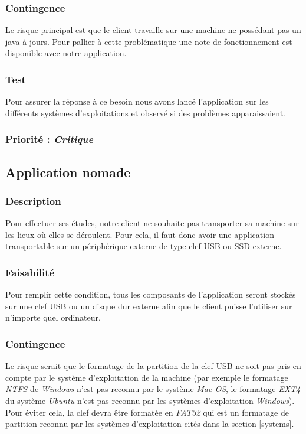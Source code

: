 \subsubsection{Contingence}

Le risque principal est que le client travaille sur une machine ne possédant pas un java à jours. Pour pallier à cette problématique une note de fonctionnement est disponible avec notre application.

\subsubsection{Test}

Pour assurer la réponse à ce besoin nous avons lancé l’application sur les différents systèmes d’exploitations et observé si des problèmes apparaissaient.

\subsubsection{Priorité : \textit{Critique}}

\subsection{Application nomade}\label{nomadite}

\subsubsection{Description}

Pour effectuer ses études, notre client ne souhaite pas transporter sa machine sur les lieux où elles se déroulent. Pour cela, il faut donc avoir une application transportable sur un périphérique externe de type clef USB ou SSD externe.

\subsubsection{Faisabilité}

Pour remplir cette condition, tous les composants de l’application seront stockés sur une clef USB ou un disque dur externe afin que le client puisse l'utiliser sur n’importe quel ordinateur.

\subsubsection{Contingence}

Le risque serait que le formatage de la partition de la clef USB ne soit pas pris en compte par le système d’exploitation de la machine (par exemple le formatage \textit{NTFS} de \textit{Windows} n’est pas reconnu par le système \textit{Mac OS}, le formatage \textit{EXT4} du système \textit{Ubuntu} n’est pas reconnu par les systèmes d’exploitation \textit{Windows}). Pour éviter cela, la clef devra être formatée en \textit{FAT32} qui est un formatage de partition reconnu par les systèmes d’exploitation cités dans la section \ref{systems}.

